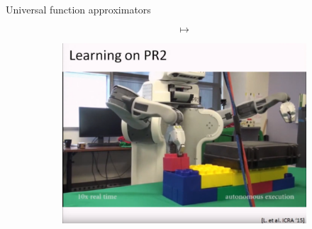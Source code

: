 \documentclass[10pt]{beamer}
\begin{document}
\begin{frame}{Universal function approximators}
{\begin{figure}
\begin{subfigure}{0.4\linewidth}
		\end{subfigure}%
		\begin{subfigure}{0.2\linewidth}
			\begin{equation*}
				\qquad \mapsto \qquad
			\end{equation*}
		\end{subfigure}%
		\begin{subfigure}{0.4\linewidth}
			\centering
			\includegraphics[width=0.7\linewidth]{robot1_f2}
		\end{subfigure}
	\end{figure}}
	
\end{frame}
\end{document}
